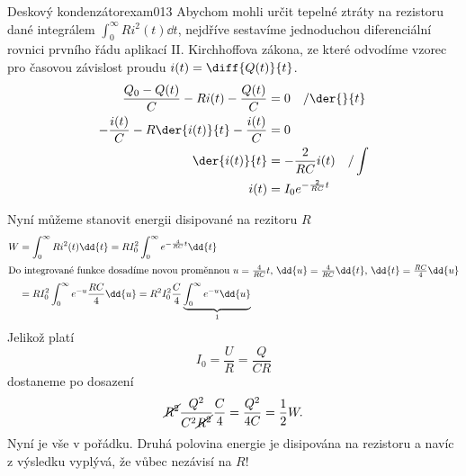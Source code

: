 \begin{fyzexam}{Deskový kondenzátor}{exam013}
  Abychom mohli určit tepelné ztráty na rezistoru dané integrálem \(\int_{0}^{\infty}
  Ri^2(t)\dd{t}\), nejdříve sestavíme jednoduchou diferenciální rovnici prvního řádu aplikací II.
  Kirchhoffova zákona, ze které odvodíme vzorec pro časovou závislost proudu \(i(t) =
  \diff{Q(t)}{t}\). 
  \begin{align*}
    \frac{Q_0 - Q(t)}{C} - Ri(t) - \frac{Q(t)}{C}           &= 0 \quad/\der{ }{t}             \\
    -\frac{i(t)}{C} - R\der{i(t)}{t} - \frac{i(t)}{C} &= 0                              \\
                                        \der{i(t)}{t} &= - \frac{2}{RC}i(t) \quad/\int  \\
                                                  i(t) &= I_0e^{-\frac{2}{RC}t}
  \end{align*}
  
  {\centering
  \captionsetup{type=figure}
  \label{fyz:fig0960}
  \par}

  Nyní můžeme stanovit energii disipované na rezitoru \(R\)
  \begin{align*}
    W   &= \int_{0}^{\infty}Ri^2(t)\dd{t} = RI_0^2\int_{0}^{\infty}e^{-\frac{4}{RC}t}\dd{t}   \\
    \shortintertext{Do integrované funkce dosadíme novou proměnnou \(u = \frac{4}{RC}t\), \(\dd{u} 
                    = \frac{4}{RC}\dd{t}\), \(\dd{t} = \frac{RC}{4}\dd{u}\)}
        &= RI_0^2\int_{0}^{\infty}e^{-u}\frac{RC}{4}\dd{u} 
        = R^2I_0^2\frac{C}{4}\underbrace{\int_{0}^{\infty}e^{-u}\dd{u}}_1 
    \end{align*}
  Jelikož platí \[I_0 = \frac{U}{R}=\frac{Q}{CR}\] dostaneme po dosazení
  \[\cancel{R^2}\frac{Q^2}{C^2\cancel{R^2}}\frac{C}{4} = \frac{Q^2}{4C}= \frac{1}{2}W.\] Nyní je
  vše v pořádku. Druhá polovina energie je disipována na rezistoru a navíc z výsledku vyplývá, že
  vůbec nezávisí na \(R\)!
\end{fyzexam}